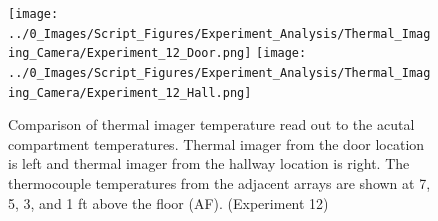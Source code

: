 \documentclass[12pt,oneside]{book}
\begin{document}

\begin{figure}[H]
\centering
\texttt{[image: ../0\_Images/Script\_Figures/Experiment\_Analysis/Thermal\_Imaging\_Camera/Experiment\_12\_Door.png]}
\texttt{[image: ../0\_Images/Script\_Figures/Experiment\_Analysis/Thermal\_Imaging\_Camera/Experiment\_12\_Hall.png]}
\caption[Thermal Imager H]{Comparison of thermal imager temperature read out to the acutal compartment temperatures. Thermal imager from the door location is left and thermal imager from the hallway location is right. The thermocouple temperatures from the adjacent arrays are shown at 7, 5, 3, and 1 ft above the floor (AF). (Experiment 12)}
\label{fig:thermal_imager_h}
\end{figure}
\end{document}
